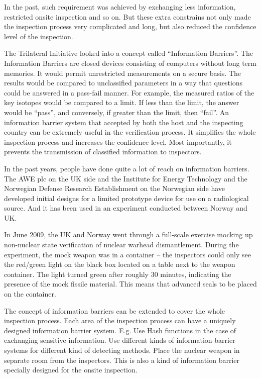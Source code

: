 \documentclass[twoside,titlepage,11pt,twocolumn,a4paper]{article}
\begin{document}
In the past, such requirement was achieved by exchanging less
information, restricted onsite inspection and so on. But these extra
constrains not only made the inspection process very complicated and
long, but also reduced the confidence level of the inspection.

The Trilateral Initiative looked into a concept called ``Information
Barriers''. The Information Barriers are closed devices consisting of
computers without long term memories. It would permit unrestricted
measurements on a secure basis. The results would be compared to
unclassified parameters in a way that questions could be answered in a
pass-fail manner. \citep{SUW2005} For example, the measured ratios of
the key isotopes would be compared to a limit. If less than the limit,
the answer would be ``pass'', and conversely, if greater than the
limit, then ``fail''. An information barrier system that accepted by
both the host and the inspecting country can be extremely useful in
the verification process. It simplifies the whole inspection process
and increases the confidence level. Most importantly, it prevents the
transmission of classified information to inspectors.


In the past years, people have done quite a lot of reach on
information barriers. The AWE plc on the UK side and the Institute for
Energy Technology and the Norwegian Defense Research Establishment on
the Norwegian side have developed initial designs for a limited
prototype device for use on a radiological source. And it has been
used in an experiment conducted between Norway and UK.

In June 2009, the UK and Norway went through a full-scale exercise
mocking up non-nuclear state verification of nuclear warhead
dismantlement.  During the experiment, the mock weapon was in a
container -- the inspectors could only see the red/green light on the
black box located on a table next to the weapon container. The light
turned green after roughly 30 minutes, indicating the presence of the
mock fissile material. This means that advanced seals to be placed on
the container.

The concept of information barriers can be extended to cover the whole
inspection process. Each area of the inspection process can have a
uniquely designed information barrier system. E.g. Use Hash functions
in the case of exchanging sensitive information. \citep{knuth1976} Use
different kinds of information barrier systems for different kind of
detecting methods. Place the nuclear weapon in separate room from the
inspectors.  This is also a kind of information barrier specially
designed for the onsite inspection.
\end{document}
